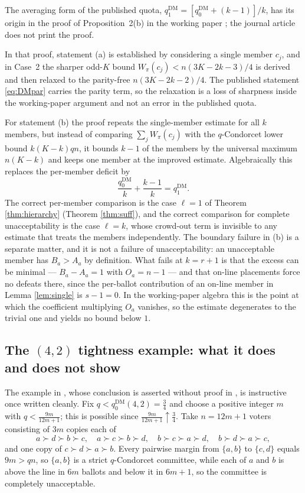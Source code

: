 \documentclass[11pt]{article}
\theoremstyle{plain}
\theoremstyle{definition}
\newcommand{\DM}{\mathrm{DM}}
\begin{document}
The averaging form of the published quota, $q_1^{\DM}=[q_0^{\DM}+(k-1)]/k$, has its origin in the proof of Proposition~2(b) in the working paper \cite[pp.~10--11]{DissMahajne2019}; the journal article does not print the proof.

In that proof, statement (a) is established by considering a single member $c_j$, and in Case~2 the sharper odd-$K$ bound $W_\pi(c_j)<n(3K-2k-3)/4$ is derived and then relaxed to the parity-free $n(3K-2k-2)/4$. The published statement \eqref{eq:DMpar} carries the parity term, so the relaxation is a loss of sharpness inside the working-paper argument and not an error in the published quota.

For statement (b) the proof repeats the single-member estimate for all $k$ members, but instead of comparing $\sum_j W_\pi(c_j)$ with the $q$-Condorcet lower bound $k(K-k)qn$, it bounds $k-1$ of the members by the universal maximum $n(K-k)$ and keeps one member at the improved estimate. Algebraically this replaces the per-member deficit by
\[
\frac{q_0^{\DM}}{k}+\frac{k-1}{k}=q_1^{\DM}.
\]
The correct per-member comparison is the case $\ell=1$ of Theorem \ref{thm:hierarchy} (Theorem \ref{thm:suff}), and the correct comparison for complete unacceptability is the case $\ell=k$, whose crowd-out term is invisible to any estimate that treats the members independently. The boundary failure in (b) is a separate matter, and it is not a failure of unacceptability: an unacceptable member has $B_a>A_a$ by definition. What fails at $k=r+1$ is that the excess can be minimal --- $B_a-A_a=1$ with $O_a=n-1$ --- and that on-line placements force no defeats there, since the per-ballot contribution of an on-line member in Lemma \ref{lem:single} is $s-1=0$. In the working-paper algebra this is the point at which the coefficient multiplying $O_a$ vanishes, so the estimate degenerates to the trivial one and yields no bound below $1$.

\subsection{The $(4,2)$ tightness example: what it does and does not show}

The example in \cite[p.~11]{DissMahajne2019}, whose conclusion is asserted without proof in \cite[Proposition~2(c)]{DissMahajne2020}, is instructive once written cleanly. Fix $q<q_0^{\DM}(4,2)=\frac34$ and choose a positive integer $m$ with $q<\frac{9m}{12m+1}$; this is possible since $\frac{9m}{12m+1}\uparrow\frac34$. Take $n=12m+1$ voters consisting of $3m$ copies each of
\[
a\succ d\succ b\succ c,\quad a\succ c\succ b\succ d,\quad b\succ c\succ a\succ d,\quad b\succ d\succ a\succ c,
\]
and one copy of $c\succ d\succ a\succ b$. Every pairwise margin from $\{a,b\}$ to $\{c,d\}$ equals $9m>qn$, so $\{a,b\}$ is a strict $q$-Condorcet committee, while each of $a$ and $b$ is above the line in $6m$ ballots and below it in $6m+1$, so the committee is completely unacceptable.
\end{document}
